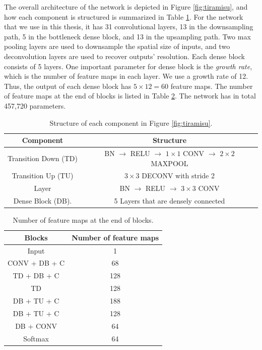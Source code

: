 The overall architecture of the network is depicted in Figure \ref{fig:tiramisu}, and how each component is structured is summarized in Table \ref{table:components}. For the network that we use in this thesis, it has 31 convolutional layers, 13 in the downsampling path, 5 in the bottleneck dense block, and 13 in the upsampling path. Two max pooling layers are used to downsample the spatial size of inputs, and two deconvolution layers are used to recover outputs' resolution. Each dense block consists of 5 layers. One important parameter for dense block is the \textit{growth rate}, which is the number of feature maps in each layer. We use a growth rate of 12. Thus, the output of each dense block has $5 \times 12 = 60$ feature maps. The number of feature maps at the end of blocks is listed in Table \ref{table:number_feature_maps}. The network has in total 457,720 parameters.

\begin{table}[H]
\centering  
\begin{tabularx}{.9\textwidth}{c|c}
    \hline
    Component            & Structure            \\ \hline \hline
    Transition Down (TD) & BN $\rightarrow$ RELU $\rightarrow$ $1 \times 1$ CONV $\rightarrow$ $2 \times 2$ MAXPOOL \\ \hline
    Transition Up (TU)   & $3 \times 3$ DECONV with stride 2 \\
   \hline
   Layer                 & BN $\rightarrow$ RELU $\rightarrow$ $3 \times 3$ CONV \\ \hline
   Dense Block (DB).     & 5 Layers that are densely connected \\ \hline
  \end{tabularx}
\caption{Structure of each component in Figure \ref{fig:tiramisu}.}
\label{table:components}
\end{table}

\begin{table}[H]
\centering  
\begin{tabularx}{.53\textwidth}{c|c}
    \hline
    Blocks            & Number of feature maps            \\ \hline \hline
    Input                &    1 \\ \hline
    CONV + DB + C        &    68 \\ \hline
    TD + DB + C          &    128 \\ \hline
    TD                   &    128 \\ \hline
    DB + TU + C          &    188 \\ \hline
    DB + TU + C          &    128 \\ \hline
    DB + CONV            &    64 \\ \hline
    Softmax           &    64 \\ \hline
  \end{tabularx}
\caption{Number of feature maps at the end of blocks.}
\label{table:number_feature_maps}
\end{table}

